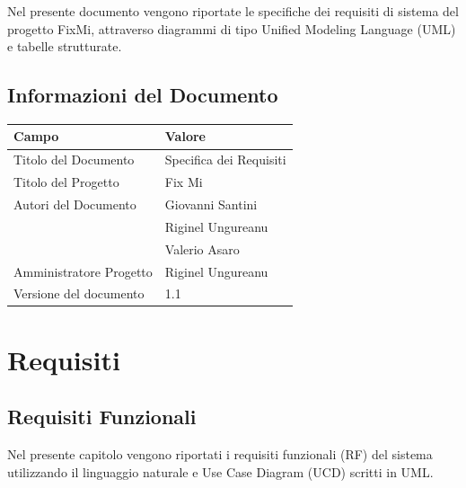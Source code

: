 \documentclass{report}
\begin{document}
	Nel presente documento vengono riportate le specifiche dei requisiti di sistema del progetto FixMi,  attraverso diagrammi di tipo Unified Modeling Language (UML) e tabelle strutturate.\\
	
	
	
	\section{Informazioni del Documento}
	
	\begin{center} %
		\centering
		\begin{tabular}{ |p{4cm}|p{4cm}|  }
			\hline
			\centering Campo & \qquad\qquad Valore \\ %
			\hline
			Titolo del Documento & Specifica dei Requisiti \\
			\hline
			Titolo del Progetto & Fix Mi \\
			\hline
			Autori del Documento &
			Giovanni Santini \\ & Riginel Ungureanu \\ & Valerio Asaro \\
			\hline
			Amministratore Progetto & Riginel Ungureanu\\
			\hline
			Versione del documento & 1.1 \\
			\hline
		\end{tabular}
	\end{center}


\chapter{Requisiti}

	
\section{Requisiti Funzionali}
Nel presente capitolo vengono riportati i requisiti funzionali (RF) del sistema utilizzando il linguaggio naturale e Use Case Diagram (UCD) scritti in UML.
\end{document}
